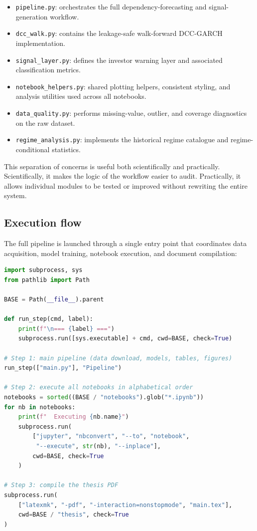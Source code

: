 \begin{itemize}
    \item \texttt{pipeline.py}: orchestrates the full dependency-forecasting and signal-generation workflow.
    \item \texttt{dcc\_walk.py}: contains the leakage-safe walk-forward DCC-GARCH implementation.
    \item \texttt{signal\_layer.py}: defines the investor warning layer and associated classification metrics.
    \item \texttt{notebook\_helpers.py}: shared plotting helpers, consistent styling, and analysis utilities used across all notebooks.
    \item \texttt{data\_quality.py}: performs missing-value, outlier, and coverage diagnostics on the raw dataset.
    \item \texttt{regime\_analysis.py}: implements the historical regime catalogue and regime-conditional statistics.
\end{itemize}

This separation of concerns is useful both scientifically and practically. Scientifically, it makes the logic of the workflow easier to audit. Practically, it allows individual modules to be tested or improved without rewriting the entire system.

\subsection{Execution flow}

The full pipeline is launched through a single entry point that coordinates data acquisition, model training, notebook execution, and document compilation:

\begin{lstlisting}[language=Python, caption={Automated full-pipeline runner (\texttt{run\_all.py}).}, label=lst:runall]
import subprocess, sys
from pathlib import Path

BASE = Path(__file__).parent

def run_step(cmd, label):
    print(f"\n=== {label} ===")
    subprocess.run([sys.executable] + cmd, cwd=BASE, check=True)

# Step 1: main pipeline (data download, models, tables, figures)
run_step(["main.py"], "Pipeline")

# Step 2: execute all notebooks in alphabetical order
notebooks = sorted((BASE / "notebooks").glob("*.ipynb"))
for nb in notebooks:
    print(f"  Executing {nb.name}")
    subprocess.run(
        ["jupyter", "nbconvert", "--to", "notebook",
         "--execute", str(nb), "--inplace"],
        cwd=BASE, check=True
    )

# Step 3: compile the thesis PDF
subprocess.run(
    ["latexmk", "-pdf", "-interaction=nonstopmode", "main.tex"],
    cwd=BASE / "thesis", check=True
)
\end{lstlisting}

